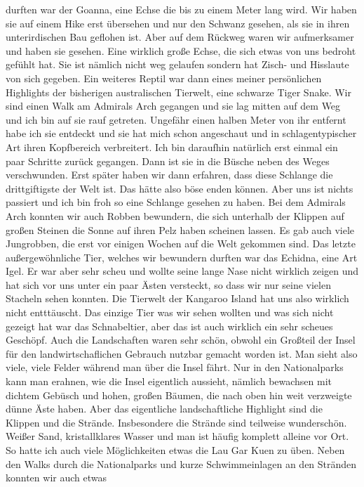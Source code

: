 \documentclass[11pt]{book}
\begin{document}
durften war der Goanna, eine Echse die bis zu einem Meter lang wird. Wir haben sie auf einem Hike erst übersehen und nur den 
Schwanz gesehen, als sie in ihren unterirdischen Bau geflohen ist. Aber auf dem Rückweg waren wir aufmerksamer und haben sie 
gesehen. Eine wirklich große Echse, die sich etwas von uns bedroht gefühlt hat. Sie ist nämlich nicht weg gelaufen sondern hat 
Zisch- und Hisslaute von sich gegeben. Ein weiteres Reptil war dann eines meiner persönlichen Highlights der bisherigen australischen 
Tierwelt, eine schwarze Tiger Snake. Wir sind einen Walk am Admirals Arch gegangen und sie lag mitten auf dem Weg und ich bin auf 
sie rauf getreten. Ungefähr einen halben Meter von ihr entfernt habe ich sie entdeckt und sie hat mich schon angeschaut und in 
schlagentypischer Art ihren Kopfbereich verbreitert. Ich bin daraufhin natürlich erst einmal ein paar Schritte zurück gegangen. Dann 
ist sie in die Büsche neben des Weges verschwunden. Erst später haben wir dann erfahren, dass diese Schlange die drittgiftigste der 
Welt ist. Das hätte also böse enden können. Aber uns ist nichts passiert und ich bin froh so eine Schlange gesehen zu haben. Bei dem 
Admirals Arch konnten wir auch Robben bewundern, die sich unterhalb der Klippen auf großen Steinen die Sonne auf ihren Pelz haben 
scheinen lassen. Es gab auch viele Jungrobben, die erst vor einigen Wochen auf die Welt gekommen sind. Das letzte außergewöhnliche 
Tier, welches wir bewundern durften war das Echidna, eine Art Igel. Er war aber sehr scheu und wollte seine lange Nase nicht 
wirklich zeigen und hat sich vor uns unter ein paar Ästen versteckt, so dass wir nur seine vielen Stacheln sehen konnten. Die 
Tierwelt der Kangaroo Island hat uns also wirklich nicht entttäuscht. Das einzige Tier was wir sehen wollten und was sich nicht 
gezeigt hat war das Schnabeltier, aber das ist auch wirklich ein sehr scheues Geschöpf. 
Auch die Landschaften waren sehr schön, obwohl ein Großteil der Insel für den landwirtschaflichen Gebrauch nutzbar gemacht worden ist.
Man sieht also viele, viele Felder während man über die Insel fährt. Nur in den Nationalparks kann man erahnen, wie die Insel eigentlich 
aussieht, nämlich bewachsen mit dichtem Gebüsch und hohen, großen Bäumen, die nach oben hin weit verzweigte dünne Äste haben. Aber 
das eigentliche landschaftliche Highlight sind die Klippen und die Strände. Insbesondere die Strände sind teilweise wunderschön. 
Weißer Sand, kristallklares Wasser und man ist häufig komplett alleine vor Ort. So hatte ich auch viele Möglichkeiten etwas die 
Lau Gar Kuen zu üben. Neben den Walks durch die Nationalparks und kurze Schwimmeinlagen an den Stränden konnten wir auch etwas 
\end{document}

